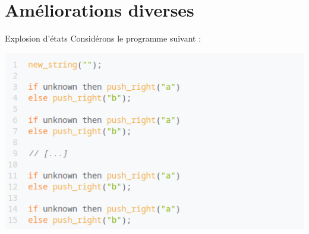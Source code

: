 \documentclass{beamer}
\begin{document}
\section{Améliorations diverses}

\begin{frame}{Explosion d'états}
  Considérons le programme suivant :
  \begin{center}
    \includegraphics[width=0.7\linewidth]{ expl0 }
  \end{center}
\end{frame}
\end{document}
